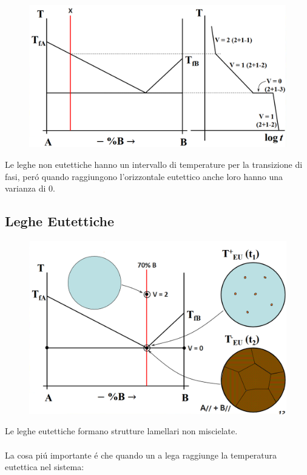 \documentclass{article}
\begin{document}
{\begin{figure}[!h]
                    \centering
                    \includegraphics[width=.85\linewidth]{Curva di Raffreddamento per una lega non-eutettica esemplare.png}
                \end{figure}
                Le leghe non eutettiche hanno un intervallo di temperature per la transizione di fasi, per\'o quando raggiungono l'orizzontale eutettico anche loro hanno una varianza di 0.
                \newpage
        \subsection{Leghe Eutettiche}
            \begin{figure}[!h]
                \centering
                \includegraphics[width=.85\linewidth]{Diagramma di cambio strutturale in un sistema completamente immiscibile binario - Parte 1.png}
            \end{figure}
            Le leghe eutettiche formano strutture lamellari non miscielate. \\ \\
            La cosa pi\'u importante \'e che quando un a lega raggiunge la temperatura eutettica nel sistema:
}
\end{document}
